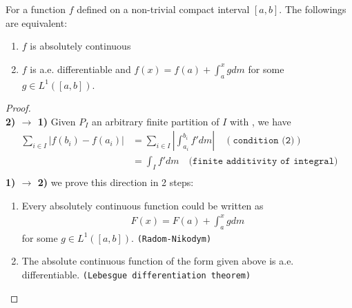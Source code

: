 \begin{theorem}
For a function $f$ defined on a non-trivial compact interval $[a, b]$. The followings are equivalent:
\begin{enumerate}
	\item $f$ is absolutely continuous
	\item $f$ is a.e. differentiable and $f(x) = f(a) + \int_a^x gdm$ for some $g \in L^1([a, b])$. 
\end{enumerate}
\end{theorem}
\begin{proof}\quad\\
\textbf{2) $\rightarrow$ 1)}
Given $P_I$ an arbitrary finite partition of $I$ with , we have
\begin{align*}
	\sum_{i \in I} |f(b_i) - f(a_i)| &= \sum_{i \in I}|\int_{a_i}^{b_i} f'dm|\quad(\texttt{condition (2)})\\
	&= \int_If'dm \quad \texttt{(finite additivity of integral)}  \\
	&
\end{align*}
\textbf{1) $\rightarrow$ 2)} we prove this direction in 2 steps:
\begin{enumerate}
	\item Every absolutely continuous function could be written as 
		\begin{align*}
			F(x) = F(a) + \int_a^x gdm 
		\end{align*}
		for some $g \in L^1([a, b])$. \texttt{(Radom-Nikodym)}
	\item The absolute continuous function of the form given above is a.e. differentiable. \texttt{(Lebesgue differentiation theorem)}
\end{enumerate}
\end{proof}


